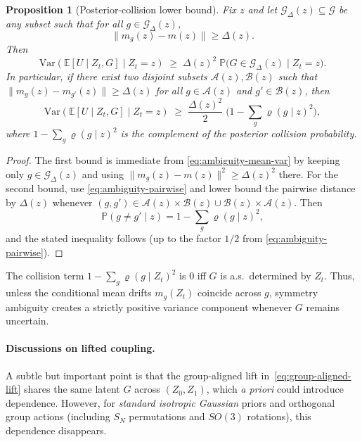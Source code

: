 \documentclass{article}
\theoremstyle{plain}
\newtheorem{proposition}[theorem]{Proposition}
\theoremstyle{definition}
\theoremstyle{remark}
\newcommand{\1}{\mathbf{1}}
\begin{document}
\begin{proposition}[Posterior-collision lower bound]
\label{prop:collision-lb}
Fix $z$ and let $\mathcal{G}_\Delta(z)\subseteq\mathcal{G}$ be any subset such that for all $g\in\mathcal{G}_\Delta(z)$,
\begin{equation}
\|m_g(z)-m(z)\|\ge \Delta(z).
\end{equation}
Then
\begin{equation}
\mathrm{Var}\!\left(\mathbb{E}[U\mid Z_t,G]\mid Z_t=z\right)
\;\ge\;
\Delta(z)^2\;\mathbb{P}\big(G\in \mathcal{G}_\Delta(z)\mid Z_t=z\big).
\end{equation}
In particular, if there exist two disjoint subsets $\mathcal{A}(z),\mathcal{B}(z)$ such that
$\|m_g(z)-m_{g'}(z)\|\ge \Delta(z)$ for all $g\in\mathcal{A}(z)$ and $g'\in\mathcal{B}(z)$, then
\begin{equation}
\mathrm{Var}\!\left(\mathbb{E}[U\mid Z_t,G]\mid Z_t=z\right)
\;\ge\;
\frac{\Delta(z)^2}{2}\;
\Big(1-\sum_{g} \varrho(g\mid z)^2\Big),
\end{equation}
where $1-\sum_g \varrho(g\mid z)^2$ is the complement of the posterior collision probability.
\end{proposition}

\begin{proof}
The first bound is immediate from \eqref{eq:ambiguity-mean-var} by keeping only $g\in\mathcal{G}_\Delta(z)$ and using
$\|m_g(z)-m(z)\|^2\ge \Delta(z)^2$ there.
For the second bound, use \eqref{eq:ambiguity-pairwise} and lower bound the pairwise distance by $\Delta(z)$ whenever
$(g,g')\in\mathcal{A}(z)\times\mathcal{B}(z)\cup \mathcal{B}(z)\times\mathcal{A}(z)$. Then
\begin{equation}
\mathbb{P}(g\neq g'\mid z)=1-\sum_g \varrho(g\mid z)^2,
\end{equation}
and the stated inequality follows (up to the factor $1/2$ from \eqref{eq:ambiguity-pairwise}).
\end{proof}

The collision term $1-\sum_g \varrho(g\mid Z_t)^2$ is $0$ iff $G$ is a.s.\ determined by $Z_t$.
Thus, unless the conditional mean drifts $m_g(Z_t)$ coincide across $g$, symmetry ambiguity creates a strictly positive
variance component whenever $G$ remains uncertain.


\paragraph{Discussions on lifted coupling.}
A subtle but important point is that the group-aligned lift in~\eqref{eq:group-aligned-lift} shares the same
latent $G$ across $(Z_0,Z_1)$, which \emph{a priori} could introduce dependence.
However, for \emph{standard isotropic Gaussian} priors and orthogonal group actions (including
$S_N$ permutations and $SO(3)$ rotations), this dependence disappears.
\end{document}
